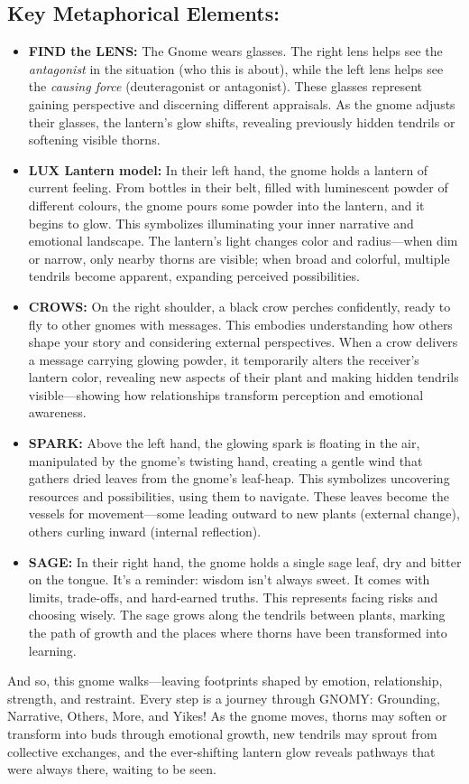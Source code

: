 \documentclass{article}
\begin{document}
\subsection*{Key Metaphorical Elements:}
\begin{itemize}[noitemsep,topsep=0pt]
    \item \textbf{FIND the LENS:} The Gnome wears glasses. The right lens helps see the \textit{antagonist} in the situation (who this is about), while the left lens helps see the \textit{causing force} (deuteragonist or antagonist). These glasses represent gaining perspective and discerning different appraisals. As the gnome adjusts their glasses, the lantern's glow shifts, revealing previously hidden tendrils or softening visible thorns.
    \item \textbf{LUX Lantern model:} In their left hand, the gnome holds a lantern of current feeling. From bottles in their belt, filled with luminescent powder of different colours, the gnome pours some powder into the lantern, and it begins to glow. This symbolizes illuminating your inner narrative and emotional landscape. The lantern's light changes color and radius—when dim or narrow, only nearby thorns are visible; when broad and colorful, multiple tendrils become apparent, expanding perceived possibilities.
    \item \textbf{CROWS:} On the right shoulder, a black crow perches confidently, ready to fly to other gnomes with messages. This embodies understanding how others shape your story and considering external perspectives. When a crow delivers a message carrying glowing powder, it temporarily alters the receiver's lantern color, revealing new aspects of their plant and making hidden tendrils visible—showing how relationships transform perception and emotional awareness.
    \item \textbf{SPARK:} Above the left hand, the glowing spark is floating in the air, manipulated by the gnome's twisting hand, creating a gentle wind that gathers dried leaves from the gnome's leaf-heap. This symbolizes uncovering resources and possibilities, using them to navigate. These leaves become the vessels for movement—some leading outward to new plants (external change), others curling inward (internal reflection).
    \item \textbf{SAGE:} In their right hand, the gnome holds a single sage leaf, dry and bitter on the tongue. It's a reminder: wisdom isn't always sweet. It comes with limits, trade-offs, and hard-earned truths. This represents facing risks and choosing wisely. The sage grows along the tendrils between plants, marking the path of growth and the places where thorns have been transformed into learning.
\end{itemize}
And so, this gnome walks—leaving footprints shaped by emotion, relationship, strength, and restraint. Every step is a journey through GNOMY: Grounding, Narrative, Others, More, and Yikes! As the gnome moves, thorns may soften or transform into buds through emotional growth, new tendrils may sprout from collective exchanges, and the ever-shifting lantern glow reveals pathways that were always there, waiting to be seen.
\end{document}
